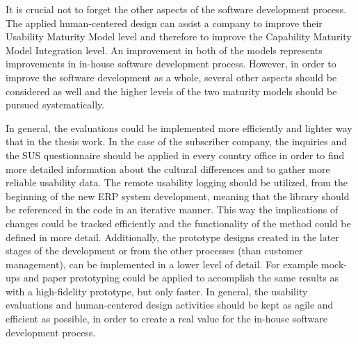 \documentclass[12pt,a4paper,oneside,pdftex]{report}
\begin{document}
It is crucial not to forget the other aspects of the software development process. The applied human-centered design can assist a company to improve their Usability Maturity Model level and therefore to improve the Capability Maturity Model Integration level. An improvement in both of the models represents improvements in in-house software development process. However, in order to improve the software development as a whole, several other aspects should be considered as well and the higher levels of the two maturity models should be pursued systematically.

In general, the evaluations could be implemented more efficiently and lighter way that in the thesis work. In the case of the subscriber company, the inquiries and the SUS questionnaire should be applied in every country office in order to find more detailed information about the cultural differences and to gather more reliable usability data. The remote usability logging should be utilized, from the beginning of the new ERP system development, meaning that the library should be referenced in the code in an iterative manner. This way the implications of changes could be tracked efficiently and the functionality of the method could be defined in more detail. Additionally, the prototype designs created in the later stages of the development or from the other processes (than customer management), can be implemented in a lower level of detail. For example mock-ups and paper prototyping could be applied to accomplish the same results as with a high-fidelity prototype, but only faster. In general, the usability evaluations and human-centered design activities should be kept as agile and efficient as possible, in order to create a real value for the in-house software development process.  
 

%
\end{document}
